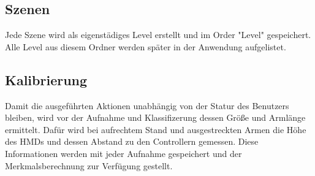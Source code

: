 \subsection{Szenen}
Jede Szene wird als eigenstädiges Level erstellt und im Order "Level" gespeichert. Alle Level aus diesem Ordner werden später in der Anwendung aufgelistet.  

\subsection{Kalibrierung}
Damit die ausgeführten Aktionen unabhängig von der Statur des Benutzers bleiben, wird vor der Aufnahme und Klassifizerung dessen Größe und Armlänge ermittelt. Dafür wird bei aufrechtem Stand und ausgestreckten Armen die Höhe des HMDs und dessen Abstand zu den Controllern gemessen. Diese Informationen werden mit jeder Aufnahme gespeichert und der Merkmalsberechnung zur Verfügung gestellt. 

